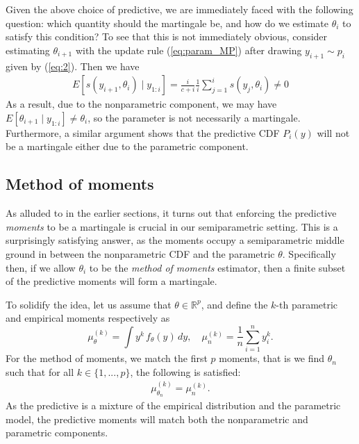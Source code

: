 \documentclass[11pt,a4paper]{article}
\theoremstyle{plain}
\theoremstyle{remark}
\theoremstyle{remark}
\begin{document}
Given the above choice of predictive, we are immediately faced with the following question: which quantity should the martingale be, and how do we estimate $\theta_i$ to satisfy this condition? To see that this is not immediately obvious, consider estimating $\theta_{i+1}$ with the update rule (\ref{eq:param_MP}) after drawing $y_{i+1} \sim p_{i}$ given by (\ref{eq:2}). Then we have
\begin{align*}
    E\left[s(y_{i+1}, \theta_{i})\mid y_{1:i}\right] = \frac{i}{c+i}\frac{1}{i} \sum_{j = 1}^i s(y_j, \theta_i) \neq 0
\end{align*}
As a result, due to the nonparametric component, we may have $E[\theta_{i+1} \mid y_{1:i}] \neq \theta_i$, so the parameter is not necessarily a martingale. Furthermore, a similar argument shows that the predictive CDF $P_i(y)$ will not be a martingale either due to the parametric component. 





\subsection{Method of moments}
As alluded to in the earlier sections, it turns out that enforcing the predictive \textit{moments} to be a martingale is crucial in our semiparametric setting. This is a surprisingly satisfying answer, as the moments occupy a semiparametric middle ground in between the nonparametric CDF and the parametric $\theta$.
Specifically then, if we allow $\theta_i$ to be the \textit{method of moments} estimator, then a finite subset of the predictive moments will form a martingale.


To solidify the idea, let us assume that $\theta \in \mathbb{R}^p$, and 
define the $k$-th parametric and empirical moments respectively as
$$\mu_\theta^{(k)}=\int y^k \,f_\theta(y)\, dy, \quad \mu_n^{(k)}=\frac{1}{n}\sum_{i=1}^ny_i^k.$$ 
For the method of moments, we match the first $p$ moments, that is we find $\theta_n$ such that for all $k\in\{1,...,p\}$, the following is satisfied:
\begin{align}\mu^{(k)}_{{\theta}_n}=\mu^{(k)}_n.\label{eq:mom_cond}
\end{align}
As the predictive is a mixture of the empirical distribution and the parametric model, the predictive moments will match both the nonparametric and parametric components.  
\end{document}
